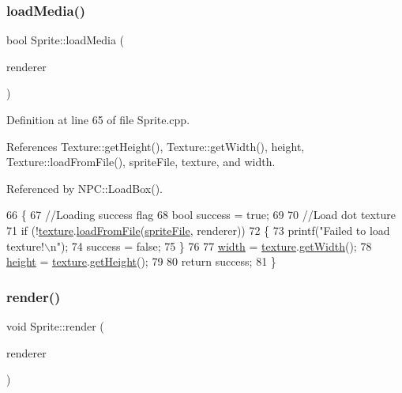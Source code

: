 \subsubsection{\texorpdfstring{load\+Media()}{loadMedia()}}
{\footnotesize\ttfamily bool Sprite\+::load\+Media (\begin{DoxyParamCaption}\item[{S\+D\+L\+\_\+\+Renderer $\ast$}]{renderer }\end{DoxyParamCaption})}



Definition at line 65 of file Sprite.\+cpp.



References Texture\+::get\+Height(), Texture\+::get\+Width(), height, Texture\+::load\+From\+File(), sprite\+File, texture, and width.



Referenced by N\+P\+C\+::\+Load\+Box().


\begin{DoxyCode}
66 \{
67     \textcolor{comment}{//Loading success flag}
68     \textcolor{keywordtype}{bool} success = \textcolor{keyword}{true};
69 
70     \textcolor{comment}{//Load dot texture}
71     \textcolor{keywordflow}{if} (!\hyperlink{class_sprite_aa4978b284ebaae7225869d238dcb32cb}{texture}.\hyperlink{class_texture_a1c143b8aa5f134bb5a8c9d4c3d950d2f}{loadFromFile}(\hyperlink{class_sprite_a595ffe434aadbc94b9abd272c0356c9d}{spriteFile}, renderer))
72     \{
73         printf(\textcolor{stringliteral}{"Failed to load texture!\(\backslash\)n"});
74         success = \textcolor{keyword}{false};
75     \}
76 
77         \hyperlink{class_sprite_a0a3364944c5e361fc9e7ae406224d682}{width} = \hyperlink{class_sprite_aa4978b284ebaae7225869d238dcb32cb}{texture}.\hyperlink{class_texture_a91a6fd3355bc870194851514194daaab}{getWidth}();
78         \hyperlink{class_sprite_a1f07c8f2080c193759aec0e13503d7ab}{height} = \hyperlink{class_sprite_aa4978b284ebaae7225869d238dcb32cb}{texture}.\hyperlink{class_texture_a80e143905655b173df5994300088ce35}{getHeight}();
79 
80     \textcolor{keywordflow}{return} success;
81 \}
\end{DoxyCode}
\mbox{\label{class_sprite_a72231a3cc5414b94ab6bfcbddc3b327c}} 
\subsubsection{\texorpdfstring{render()}{render()}}
{\footnotesize\ttfamily void Sprite\+::render (\begin{DoxyParamCaption}\item[{S\+D\+L\+\_\+\+Renderer $\ast$}]{renderer }\end{DoxyParamCaption})}



